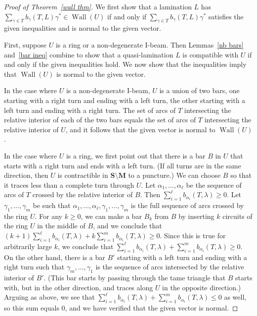 \documentclass{amsart}
\theoremstyle{definition}
\theoremstyle{remark}
\numberwithin{equation}{section}
\newcommand{\0}{{\mathbf{0}}}
\newcommand{\M}{\mathbf{M}}
\renewcommand{\S}{\mathbf{S}}
\newcommand{\Wall}{\operatorname{Wall}}
\begin{document}
\begin{proof}[Proof of Theorem~\ref{wall thm}]
We first show that a lamination $L$ has $\sum_{\gamma\in T}b_\gamma(T,L)\gamma^*\in\Wall(U)$ if and only if $\sum_{\gamma\in T}b_\gamma(T,L)\gamma^*$ satisfies the given inequalities and is normal to the given vector.

First, suppose $U$ is a ring or a non-degenerate I-beam.
Then Lemmas~\ref{nb bars} and~\ref{bar ineq} combine to show that a quasi-lamination $L$ is compatible with $U$ if and only if the given inequalities hold.
We now show that the inequalities imply that $\Wall(U)$ is normal to the given vector.

In the case where $U$ is a non-degenerate I-beam, $U$ is a union of two bars, one starting with a right turn and ending with a left turn, the other starting with a left turn and ending with a right turn.
The set of arcs of $T$ intersecting the relative interior of each of the two bars equals the set of arcs of $T$ intersecting the relative interior of $U$, and it follows that the given vector is normal to $\Wall(U)$.

In the case where $U$ is a ring, we first point out that there is a bar $B$ in $U$ that starts with a right turn and ends with a left turn.
(If all turns are in the same direction, then $U$ is contractible in $\S\setminus\M$ to a puncture.)
We can choose $B$ so that it traces less than a complete turn through $U$.
Let $\alpha_1,\ldots,\alpha_\ell$ be the sequence of arcs of $T$ crossed by the relative interior of $B$.
Then $\sum_{i=1}^\ell b_{\alpha_i}(T,\lambda)\geq 0$.
Let $\gamma_1,\ldots,\gamma_m$ be such that $\alpha_1,\ldots,\alpha_\ell,\gamma_1,\ldots,\gamma_m$ is the full sequence of arcs crossed by the ring $U$.
For any $k\ge0$, we can make a bar $B_k$ from $B$ by inserting $k$ circuits of the ring $U$ in the middle of $B$, and we conclude that $(k+1)\sum_{i=1}^\ell b_{\alpha_i}(T,\lambda)+k\sum_{i=1}^m b_{\alpha_i}(T,\lambda)\geq 0$.
Since this is true for arbitrarily large $k$, we conclude that $\sum_{i=1}^\ell b_{\alpha_i}(T,\lambda)+\sum_{i=1}^m b_{\alpha_i}(T,\lambda)\geq 0$.
On the other hand, there is a bar $B'$ starting with a left turn and ending with a right turn such that $\gamma_m,\ldots,\gamma_1$ is the sequence of arcs intersected by the relative interior of $B'$.
(This bar starts by passing through the tame triangle that $B$ starts with, but in the other direction, and traces along $U$ in the opposite direction.)
Arguing as above, we see that $\sum_{i=1}^\ell b_{\alpha_i}(T,\lambda)+\sum_{i=1}^m b_{\alpha_i}(T,\lambda)\leq 0$ as well, so this sum equals $0$, and we have verified that the given vector is normal.


\end{proof}
\end{document}
